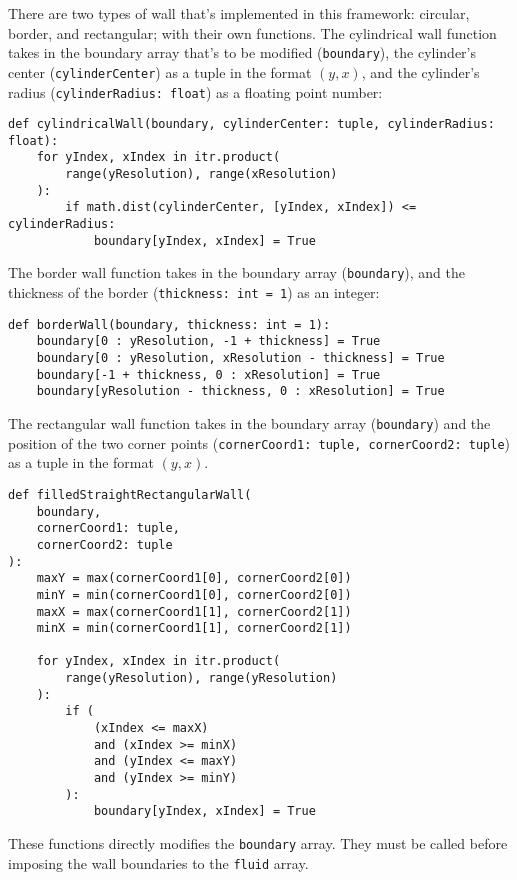 There are two types of wall that's implemented in this framework: circular, border, and rectangular; with their own functions. The cylindrical wall function takes in the boundary array that's to be modified (\texttt{boundary}), the cylinder's center (\texttt{cylinderCenter}) as a tuple in the format $(y, x)$, and the cylinder's radius (\texttt{cylinderRadius: float}) as a floating point number:
\begin{verbatim}
def cylindricalWall(boundary, cylinderCenter: tuple, cylinderRadius: float):
    for yIndex, xIndex in itr.product(
        range(yResolution), range(xResolution)
    ):
        if math.dist(cylinderCenter, [yIndex, xIndex]) <= cylinderRadius:
            boundary[yIndex, xIndex] = True
\end{verbatim}
The border wall function takes in the boundary array (\texttt{boundary}), and the thickness of the border (\texttt{thickness: int = 1}) as an integer:
\begin{verbatim}
def borderWall(boundary, thickness: int = 1):
    boundary[0 : yResolution, -1 + thickness] = True
    boundary[0 : yResolution, xResolution - thickness] = True
    boundary[-1 + thickness, 0 : xResolution] = True
    boundary[yResolution - thickness, 0 : xResolution] = True
\end{verbatim}
The rectangular wall function takes in the boundary array (\texttt{boundary}) and the position of the two corner points (\texttt{cornerCoord1: tuple, cornerCoord2: tuple}) as a tuple in the format $(y, x)$.
\begin{verbatim}
def filledStraightRectangularWall(
    boundary,
    cornerCoord1: tuple,
    cornerCoord2: tuple
):
    maxY = max(cornerCoord1[0], cornerCoord2[0])
    minY = min(cornerCoord1[0], cornerCoord2[0])
    maxX = max(cornerCoord1[1], cornerCoord2[1])
    minX = min(cornerCoord1[1], cornerCoord2[1])

    for yIndex, xIndex in itr.product(
        range(yResolution), range(yResolution)
    ):
        if (
            (xIndex <= maxX)
            and (xIndex >= minX)
            and (yIndex <= maxY)
            and (yIndex >= minY)
        ):
            boundary[yIndex, xIndex] = True
\end{verbatim}
These functions directly modifies the \texttt{boundary} array. They must be called before imposing the wall boundaries to the \texttt{fluid} array.

